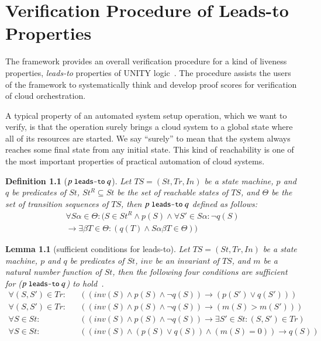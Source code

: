 \documentclass[12pt]{report}
\newtheorem{lemma}{Lemma}
\newtheorem{definition}{Definition}
\newcommand{\ra}{\rightarrow}
\newcommand{\mbstt}[1]{\mbox{\small{\tt {#1}}}}
\newcommand{\ul}{\underline}
\begin{document}
\chapter{Verification Procedure of Leads-to Properties}
\label{chap:verification}
The framework provides an overall verification procedure for a kind of
liveness properties, {\it leads-to} properties of UNITY
logic~\cite{DBLP:books/daglib/0067338}.  The procedure assists the
users of the framework to systematically think and develop proof
scores for verification of cloud orchestration.

A typical property of an automated system setup operation, which we
want to verify, is that the operation surely brings a cloud system to
a global state where all of its resources are started.  We say ``surely''
to mean that the system always reaches some final state from any
initial state. This kind of reachability is one of the most important
properties of practical automation of cloud systems.

\begin{definition}[$p~\mbstt{leads-to}~q$]
  Let $TS=(St,Tr,In)$ be a state machine, $p$ and $q$ be predicates of
  $St$, $St^R\subseteq St$ be the set of reachable states of $TS$, and
  $\Theta$ be the set of transition sequences of $TS$, then
  \ul{$p~\mbstt{leads-to}~q$} defined as follows:
  \begin{eqnarray*}
  \forall S\alpha\in \Theta: (S\in St^R \land p(S) \land
  \forall S'\in S\alpha: \neg q(S)\\
  \ra \exists \beta T\in \Theta:(q(T) \land S\alpha\beta T\in \Theta))
  \end{eqnarray*}
\end{definition}

\begin{lemma}[sufficient conditions for leads-to]
  Let $TS=(St,Tr,In)$ be a state machine, $p$ and $q$ be predicates of
  $St$, $inv$ be an invariant of $TS$, and $m$ be a natural number
  function of $St$, then the following four conditions are sufficient
  for ($p~\mbstt{leads-to}~q$) to hold~\cite{Futatsugi15}.
\begin{eqnarray*}
\forall (S,S')\in Tr:&&((inv(S)\land p(S)\land\neg q(S))\ra(p(S')\lor q(S')))\\
\forall (S,S')\in Tr:&&((inv(S)\land p(S)\land\neg q(S))\ra(m(S) > m(S')))\\
\forall S\in St:&&((inv(S)\land p(S)\land\neg q(S))\ra\exists S'\in St:(S,S')\in Tr)\\
\forall S\in St:&&((inv(S)\land (p(S)\lor q(S))\land(m(S) = 0)) \ra q(S))
\end{eqnarray*}
\end{lemma}
\end{document}
